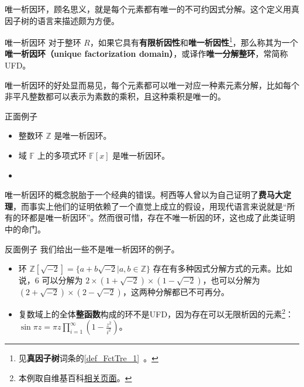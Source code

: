 


唯一析因环，顾名思义，就是每个元素都有唯一的不可约因式分解。这个定义用真因子树的语言来描述颇为方便。

\begin{definition}{唯一析因环}
对于整环 $R$，如果它具有\textbf{有限析因性}和\textbf{唯一析因性}\footnote{见\textbf{真因子树}词条的\autoref{def_FctTre_1}~。}，那么称其为一个\textbf{唯一析因环（unique factorization domain）}，或译作\textbf{唯一分解整环}，常简称UFD。
\end{definition}


唯一析因环的好处显而易见，每个元素都可以唯一对应一种素元素分解，比如每个非平凡整数都可以表示为素数的乘积，且这种乘积是唯一的。

\begin{example}{正面例子}
\begin{itemize}
\item 整数环 $\mathbb{Z}$ 是唯一析因环。
\item 域 $\mathbb{F}$ 上的多项式环 $\mathbb{F}[x]$ 是唯一析因环。
\item 
\end{itemize}
\end{example}

唯一析因环的概念脱胎于一个经典的错误。柯西等人曾以为自己证明了\textbf{费马大定理}，而事实上他们的证明依赖了一个直觉上成立的假设，用现代语言来说就是“所有的环都是唯一析因环”。然而很可惜，存在不唯一析因的环，这也成了此类证明中的命门。

\begin{example}{反面例子}
我们给出一些不是唯一析因环的例子。
\begin{itemize}
\item 环 $\mathbb{Z}[\sqrt{-2}]=\{a+b\sqrt{-2}|a, b\in\mathbb{Z}\}$ 存在有多种因式分解方式的元素。比如说，$6$ 可以分解为 $2\times (1+\sqrt{-2})\times(1-\sqrt{-2})$，也可以分解为 $(2+\sqrt{-2})\times(2-\sqrt{-2})$，这两种分解都已不可再分。
\item 复数域上的全体\textbf{整函数}构成的环不是UFD，因为存在可以无限析因的元素\footnote{本例取自维基百科\href{https://en.wikipedia.org/wiki/Unique_factorization_domain}{相关页面}。}：$\sin{\pi z=\pi z\prod\limits_{i=1}^\infty(1-\frac{z^2}{i^2})}$。
\end{itemize}
\end{example}

